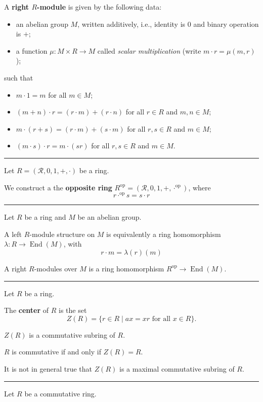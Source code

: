 \documentclass[12pt]{article}
\newcommand{\keyword}[1]{\textbf{#1}}
\newcommand{\sepline}{\rule{\textwidth}{0.4pt}}
\theoremstyle{definition}
\newcommand{\RR}{\mathcal{R}}
\newcommand{\<}{\left\langle}
\renewcommand{\>}{\right\rangle}
\newcommand{\op}{\mathrm{op}}
\DeclareMathOperator{\End}{End}
\renewcommand{\_}[1]{{_{#1}}}
\begin{document}
A \keyword{right $R$-module} is given by the following data:
\begin{itemize}
    \item an abelian group $M$, written additively, i.e., identity is $0$ and binary operation is $+$;
    \item a function $\mu : M \times R \to M$ called \emph{scalar multiplication} (write $m \cdot r = \mu(m, r)$);
\end{itemize}
such that
\begin{itemize}
    \item $m \cdot 1 = m$ for all $m \in M$;
    \item $(m + n) \cdot r = (r \cdot m) + (r \cdot n)$ for all $r \in R$ and $m, n \in M$;
    \item $m \cdot (r + s) = (r \cdot m) + (s \cdot m)$ for all $r, s \in R$ and $m \in M$;
    \item $(m \cdot s) \cdot r = m \cdot (sr)$ for all $r, s \in R$ and $m \in M$.
\end{itemize}

\sepline

Let $R = (\RR, 0, 1, +, \cdot)$ be a ring.

We construct a the \keyword{opposite ring} $R^\op = (\RR, 0, 1, +, \cdot^\op)$, where
\[
    r \cdot^\op s = s \cdot r
\]

\sepline

Let $R$ be a ring and $M$ be an abelian group.

A left $R$-module structure on $M$ is equivalently a ring homomorphism $\lambda : R \to \End(M)$, with
\[
    r \cdot m = \lambda(r)(m)
\]

A right $R$-modules over $M$ is a ring homomorphism $R^\op \to \End(M)$.








\newpage
\sepline

Let $R$ be a ring.

The \keyword{center} of $R$ is the set
\[
    Z(R) = \{r \in R \mid ax = xr \text{ for all } x \in R\}.
\]

$Z(R)$ is a commutative subring of $R$.

$R$ is commutative if and only if $Z(R) = R$.

It is not in general true that $Z(R)$ is a maximal commutative subring of $R$.

\sepline

Let $R$ be a commutative ring.
\end{document}
